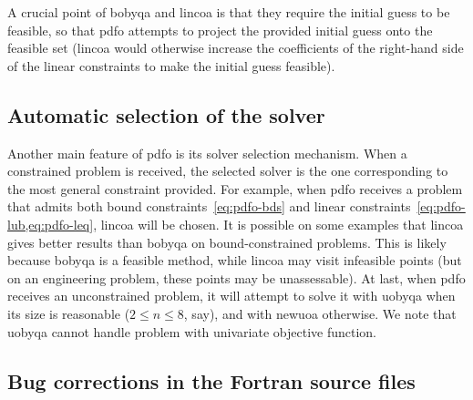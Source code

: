 A crucial point of \gls{bobyqa} and \gls{lincoa} is that they require the initial guess to be feasible, so that \gls{pdfo} attempts to project the provided initial guess onto the feasible set (\gls{lincoa} would otherwise increase the coefficients of the right-hand side of the linear constraints to make the initial guess feasible).

\subsection{Automatic selection of the solver}
\label{subsec:solver-selection}

Another main feature of \gls{pdfo} is its solver selection mechanism.
When a constrained problem is received, the selected solver is the one corresponding to the most general constraint provided.
For example, when \gls{pdfo} receives a problem that admits both bound constraints~\cref{eq:pdfo-bds} and linear constraints~\cref{eq:pdfo-lub,eq:pdfo-leq}, \gls{lincoa} will be chosen.
It is possible on some examples that \gls{lincoa} gives better results than \gls{bobyqa} on bound-constrained problems.
This is likely because \gls{bobyqa} is a feasible method, while \gls{lincoa} may visit infeasible points (but on an engineering problem, these points may be unassessable).
At last, when \gls{pdfo} receives an unconstrained problem, it will attempt to solve it with \gls{uobyqa} when its size is reasonable ($2 \le n \le 8$, say), and with \gls{newuoa} otherwise.
We note that \gls{uobyqa} cannot handle problem with univariate objective function.

\subsection{Bug corrections in the Fortran source files}
\label{subsec:bug-corrections}

